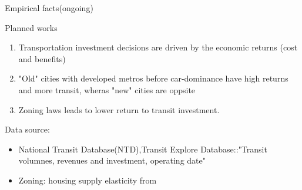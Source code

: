 \documentclass[10pt]{beamer}
\begin{document}
\begin{frame}{Empirical facts(ongoing)}
\begin{block}{Planned works}
\begin{enumerate}
    \item Transportation investment decisions are driven by the economic returns (cost and benefits) 
    \item "Old" cities with developed metros before car-dominance have high returns and more transit, wheras "new" cities are oppsite
    \item Zoning laws leads to lower return to transit investment.
\end{enumerate}
\end{block}

\vspace{0.4cm}
Data source:
\begin{itemize}
    \item  National Transit Database(NTD),Transit Explore Database::"Transit volumnes, revenues and investment, operating date"
    \item Zoning: housing supply elasticity from \textcite{Baum-Snow2024-ii}
\end{itemize}
\end{frame}
\end{document}
